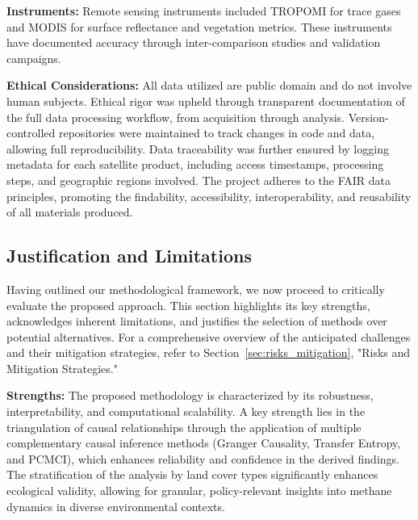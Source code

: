 \textbf{Instruments:}
Remote sensing instruments included TROPOMI for trace gases and MODIS for surface reflectance and vegetation metrics. These instruments have documented accuracy through inter-comparison studies and validation campaigns.

\textbf{Ethical Considerations:}
All data utilized are public domain and do not involve human subjects. Ethical rigor was upheld through transparent documentation of the full data processing workflow, from acquisition through analysis. Version-controlled repositories were maintained to track changes in code and data, allowing full reproducibility. Data traceability was further ensured by logging metadata for each satellite product, including access timestamps, processing steps, and geographic regions involved. The project adheres to the FAIR data principles, promoting the findability, accessibility, interoperability, and reusability of all materials produced.


\subsection{Justification and Limitations}

Having outlined our methodological framework, we now proceed to critically evaluate the proposed approach. This section highlights its key strengths, acknowledges inherent limitations, and justifies the selection of methods over potential alternatives. For a comprehensive overview of the anticipated challenges and their mitigation strategies, refer to Section~\ref{sec:risks_mitigation}, "Risks and Mitigation Strategies."

\textbf{Strengths:}
The proposed methodology is characterized by its robustness, interpretability, and computational scalability. A key strength lies in the triangulation of causal relationships through the application of multiple complementary causal inference methods (Granger Causality, Transfer Entropy, and PCMCI), which enhances reliability and confidence in the derived findings. The stratification of the analysis by land cover types significantly enhances ecological validity, allowing for granular, policy-relevant insights into methane dynamics in diverse environmental contexts.

